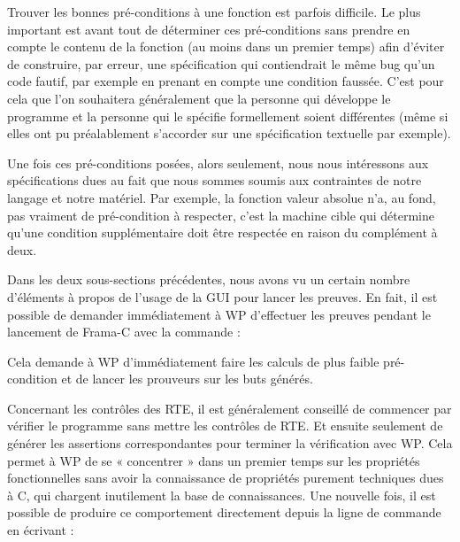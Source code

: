 \documentclass[middle]{zmdocument}
\begin{document}


Trouver les bonnes pré-conditions à une fonction est parfois difficile. Le plus
important est avant tout de déterminer ces pré-conditions sans prendre en compte
le contenu de la fonction (au moins dans un premier temps) afin d'éviter de 
construire, par erreur, une spécification qui contiendrait le même bug qu'un code
fautif, par exemple en prenant en compte une condition faussée. C'est pour cela que
l'on souhaitera généralement que la personne qui développe le programme et la 
personne qui le spécifie formellement soient différentes (même si elles ont pu
préalablement s'accorder sur une spécification textuelle par exemple).



Une fois ces pré-conditions posées, alors seulement, nous nous intéressons aux
spécifications dues au fait que nous sommes soumis aux contraintes de notre langage
et notre matériel. Par exemple, la fonction valeur absolue n'a, au fond, pas 
vraiment de pré-condition à respecter, c'est la machine cible qui détermine qu'une
condition supplémentaire doit être respectée en raison du complément à deux.





Dans les deux sous-sections précédentes, nous avons vu un certain nombre 
d'éléments à propos de l'usage de la GUI pour lancer les preuves. En fait, 
il est possible de demander immédiatement à WP d'effectuer les preuves pendant
le lancement de Frama-C avec la commande :






Cela demande à WP d'immédiatement faire les calculs de plus faible pré-condition
et de lancer les prouveurs sur les buts générés.



Concernant les contrôles des RTE, il est généralement conseillé de commencer par
vérifier le programme sans mettre les contrôles de RTE. Et ensuite seulement de
générer les assertions correspondantes pour terminer la vérification avec WP. 
Cela permet à WP de se « concentrer » dans un premier temps sur les propriétés 
fonctionnelles sans avoir la connaissance de propriétés purement techniques dues
à C, qui chargent inutilement la base de connaissances. Une nouvelle fois, il est
possible de produire ce comportement directement depuis la ligne de commande en
écrivant :
\end{document}
